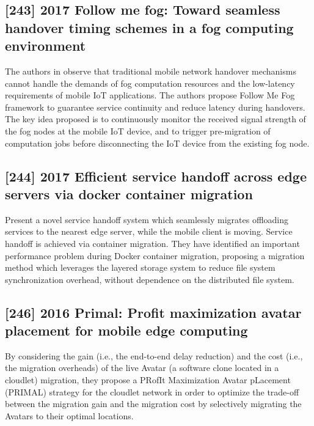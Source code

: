 \subsection{[243] 2017 Follow me fog: Toward seamless handover timing schemes in a fog computing environment}
\label{subsec:paper13} \cite{bao2017follow}
The authors in observe that traditional mobile network handover mechanisms cannot handle the demands of fog computation resources and the low-latency requirements of mobile IoT applications. The authors propose Follow Me Fog framework to guarantee service continuity and reduce latency during handovers. The key idea proposed is to continuously monitor the received signal strength of the fog nodes at the mobile IoT device, and to trigger pre-migration of computation jobs before disconnecting the IoT device from the existing fog node.

\subsection{[244] 2017 Efficient service handoff across edge servers via docker container migration}
\label{subsec:paper14} \cite{ma2017efficient}
Present a novel service handoff system which seamlessly migrates offloading services to the nearest edge server, while the mobile client is moving. Service handoff is achieved via container migration. They have identified an important performance problem during Docker container migration, proposing a migration method which leverages the layered storage system to reduce file system synchronization overhead, without dependence on the distributed file system.

\subsection{[246] 2016 Primal: Profit maximization avatar placement for mobile edge computing}
\label{subsec:paper15} \cite{sun2016primal}
By considering the gain (i.e., the end-to-end delay reduction) and the cost (i.e., the migration overheads) of the live Avatar (a software clone located in a cloudlet) migration, they propose a PRofIt Maximization Avatar pLacement (PRIMAL) strategy for the cloudlet network in order to optimize the trade-off between the migration gain and the migration cost by selectively migrating the Avatars to their optimal locations.

